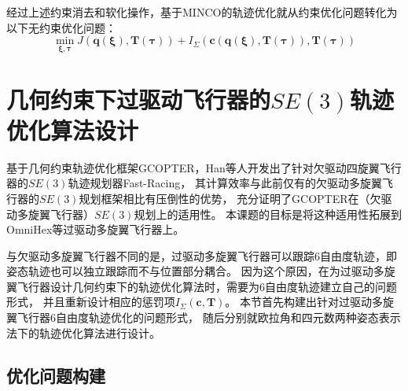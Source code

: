 经过上述约束消去和软化操作，基于MINCO的轨迹优化就从约束优化问题转化为以下无约束优化问题：
\begin{equation}
  \min_{\bm{\xi}, \bm{\tau}}
  J(\bm{q}(\bm{\xi}), \bm{T}(\bm{\tau})) + 
  I_{\Sigma}(\bm{c}(\bm{q}(\bm{\xi}), \bm{T}(\bm{\tau})), \bm{T}(\bm{\tau}))
  \label{equ:final_unconstrained_optimization_problem}
\end{equation}

\section{几何约束下过驱动飞行器的$SE(3)$轨迹优化算法设计} \label{sec:geometrically_constrained_SE3_planning_for_omnihex}
基于几何约束轨迹优化框架GCOPTER，Han等人开发出了针对欠驱动四旋翼飞行器的$SE(3)$轨迹规划器Fast-Racing\cite{2021Fast}，
其计算效率与此前仅有的欠驱动多旋翼飞行器的$SE(3)$规划框架\cite{liu2018search}相比有压倒性的优势，
充分证明了GCOPTER在（欠驱动多旋翼飞行器）$SE(3)$规划上的适用性。
本课题的目标是将这种适用性拓展到OmniHex等过驱动多旋翼飞行器上。

与欠驱动多旋翼飞行器不同的是，过驱动多旋翼飞行器可以跟踪6自由度轨迹，即姿态轨迹也可以独立跟踪而不与位置部分耦合。
因为这个原因，在为过驱动多旋翼飞行器设计几何约束下的轨迹优化算法时，需要为6自由度轨迹建立自己的问题形式，
并且重新设计相应的惩罚项$I_{\Sigma}(\bm{c}, \bm{T})$。
本节首先构建出针对过驱动多旋翼飞行器6自由度轨迹优化的问题形式，
随后分别就欧拉角和四元数两种姿态表示法下的轨迹优化算法进行设计。

\subsection{优化问题构建}\label{subsec:problem_setup}
